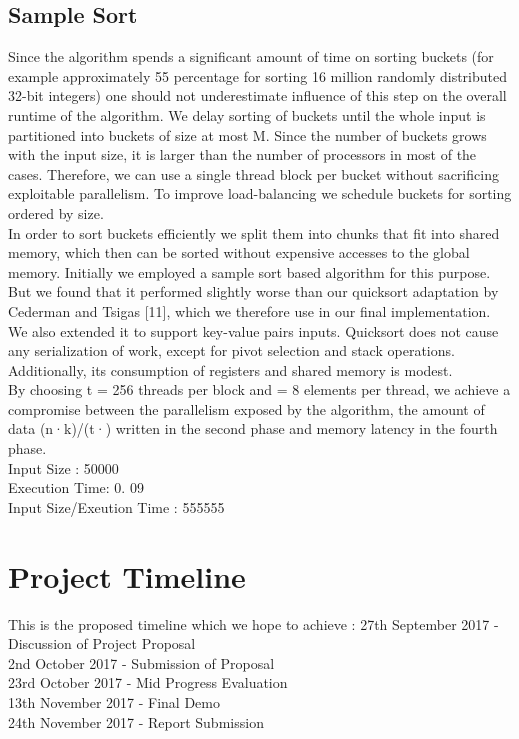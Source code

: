\documentclass[journal]{IEEEtran}
\begin{document}
\subsection{Sample Sort}
Since the algorithm spends a significant
amount of time on sorting buckets (for example approximately
55 percentage for sorting 16 million randomly distributed
32-bit integers) one should not underestimate influence of
this step on the overall runtime of the algorithm. We delay
sorting of buckets until the whole input is partitioned into
buckets of size at most M. Since the number of buckets
grows with the input size, it is larger than the number of
processors in most of the cases. Therefore, we can use a
single thread block per bucket without sacrificing exploitable
parallelism. To improve load-balancing we schedule buckets
for sorting ordered by size.\\
In order to sort buckets efficiently we split them into
chunks that fit into shared memory, which then can be
sorted without expensive accesses to the global memory.
Initially we employed a sample sort based algorithm for
this purpose. But we found that it performed slightly worse
than our quicksort adaptation by Cederman and Tsigas [11],
which we therefore use in our final implementation. We
also extended it to support key-value pairs inputs. Quicksort
does not cause any serialization of work, except for pivot
selection and stack operations. Additionally, its consumption
of registers and shared memory is modest. \\
 By choosing t = 256 threads per block and = 8
elements per thread, we achieve a compromise between the
parallelism exposed by the algorithm, the amount of data
(n·k)/(t·) written in the second phase and memory latency
in the fourth phase.\\
Input Size : 50000\\
Execution Time: 0. 09\\
Input Size/Exeution Time : 555555 \\
\section{Project Timeline }
This is the proposed timeline which we hope to achieve : 
27th September 2017 - Discussion of Project Proposal\\
2nd October 2017 - Submission of Proposal\\
23rd October 2017 - Mid Progress Evaluation\\
13th November 2017 - Final Demo\\
24th November 2017 - Report Submission\\
\end{document}
